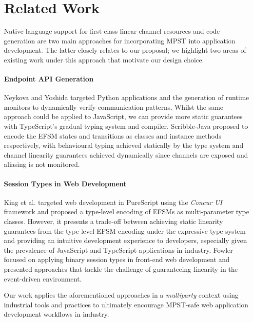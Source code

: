 \section{Related Work}
Native language support for first-class linear channel resources \cite{ATS} and
code generation are two main approaches for incorporating MPST into application
development.
The latter closely relates to our proposal;
we highlight two areas of existing work under this approach that motivate our
design choice.

\paragraph{Endpoint API Generation}
Neykova and Yoshida targeted Python applications and the generation of runtime
monitors \cite{Python2017} to dynamically verify communication patterns.
Whilst the same approach could be applied to JavaScript, we can provide more
static guarantees with TypeScript's gradual typing system and compiler. Scribble-Java \cite{Hybrid2016} proposed to encode the EFSM
states and transitions as classes and instance methods respectively, with
behavioural typing achieved statically by the type system and channel linearity
guarantees achieved dynamically since channels are exposed and
aliasing is not monitored.

\paragraph{Session Types in Web Development}
King et al. \cite{PureScript2019} targeted web development in PureScript using the
\textit{Concur UI} framework and proposed a type-level encoding of EFSMs as
multi-parameter type classes.
However, it presents a trade-off between achieving static linearity guarantees
from the type-level EFSM encoding under the expressive type system and
providing an intuitive development experience to developers, especially given
the prevalence of JavaScript and TypeScript applications in industry. Fowler \cite{MVU2019} focused on applying binary session types in front-end web
development and presented approaches that tackle the challenge of guaranteeing
linearity in the event-driven environment.

Our work applies the aforementioned approaches in a \textit{multiparty} context
using industrial tools and practices to ultimately encourage MPST-safe web
application development workflows in industry.


